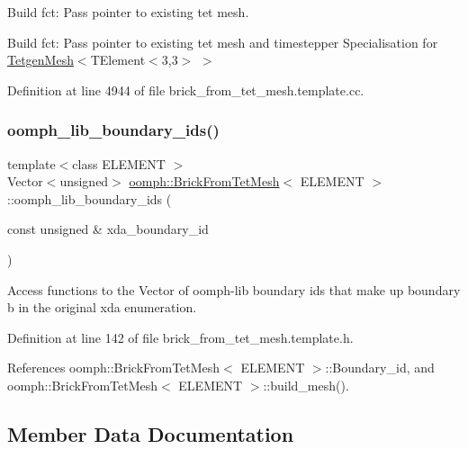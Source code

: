 Build fct\+: Pass pointer to existing tet mesh. 

Build fct\+: Pass pointer to existing tet mesh and timestepper Specialisation for \hyperlink{classoomph_1_1TetgenMesh}{Tetgen\+Mesh}$<$T\+Element$<$3,3$>$ $>$ 

Definition at line 4944 of file brick\+\_\+from\+\_\+tet\+\_\+mesh.\+template.\+cc.

\mbox{\label{classoomph_1_1BrickFromTetMesh_aeca8c8e899bdafb9eb24f36c500c7df6}} 
\subsubsection{\texorpdfstring{oomph\+\_\+lib\+\_\+boundary\+\_\+ids()}{oomph\_lib\_boundary\_ids()}}
{\footnotesize\ttfamily template$<$class E\+L\+E\+M\+E\+NT $>$ \\
Vector$<$unsigned$>$ \hyperlink{classoomph_1_1BrickFromTetMesh}{oomph\+::\+Brick\+From\+Tet\+Mesh}$<$ E\+L\+E\+M\+E\+NT $>$\+::oomph\+\_\+lib\+\_\+boundary\+\_\+ids (\begin{DoxyParamCaption}\item[{const unsigned \&}]{xda\+\_\+boundary\+\_\+id }\end{DoxyParamCaption})\hspace{0.3cm}{\ttfamily [inline]}}



Access functions to the Vector of oomph-\/lib boundary ids that make up boundary b in the original xda enumeration. 



Definition at line 142 of file brick\+\_\+from\+\_\+tet\+\_\+mesh.\+template.\+h.



References oomph\+::\+Brick\+From\+Tet\+Mesh$<$ E\+L\+E\+M\+E\+N\+T $>$\+::\+Boundary\+\_\+id, and oomph\+::\+Brick\+From\+Tet\+Mesh$<$ E\+L\+E\+M\+E\+N\+T $>$\+::build\+\_\+mesh().



\subsection{Member Data Documentation}
\mbox{\label{classoomph_1_1BrickFromTetMesh_a0f6a4b80993ee015038c36ff1aa5556f}} 
